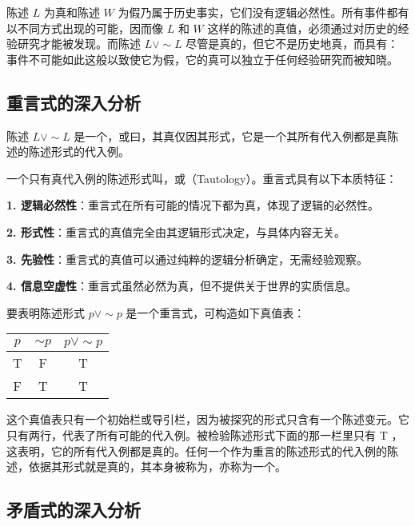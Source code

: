 陈述 $L$ 为真和陈述 $W$ 为假乃属于历史事实，它们没有逻辑必然性。所有事件都有以不同方式出现的可能，因而像 $L$ 和 $W$ 这样的陈述的真值，必须通过对历史的经验研究才能被发现。而陈述 $L \vee \sim L$ 尽管是真的，但它不是历史地真，而具有：事件不可能如此这般以致使它为假，它的真可以独立于任何经验研究而被知晓。

\subsection{重言式的深入分析}

陈述 $L \vee \sim L$ 是一个，或曰，其真仅因其形式，它是一个其所有代入例都是真陈述的陈述形式的代入例。

\begin{theorembox}[title=重言式的本质特征]
一个只有真代入例的陈述形式叫，或（Tautology）。重言式具有以下本质特征：

\textbf{1. 逻辑必然性}：重言式在所有可能的情况下都为真，体现了逻辑的必然性。

\textbf{2. 形式性}：重言式的真值完全由其逻辑形式决定，与具体内容无关。

\textbf{3. 先验性}：重言式的真值可以通过纯粹的逻辑分析确定，无需经验观察。

\textbf{4. 信息空虚性}：重言式虽然必然为真，但不提供关于世界的实质信息。
\end{theorembox}

要表明陈述形式 $p \vee \sim p$ 是一个重言式，可构造如下真值表：

\begin{center}
\begin{tabular}{|ccc|}
\hline
$p$ & $\sim p$ & $p \vee \sim p$ \\
\hline
T & F & T \\
F & T & T \\
\hline
\end{tabular}
\end{center}

这个真值表只有一个初始栏或导引栏，因为被探究的形式只含有一个陈述变元。它只有两行，代表了所有可能的代入例。被检验陈述形式下面的那一栏里只有 T ，这表明，它的所有代入例都是真的。任何一个作为重言的陈述形式的代入例的陈述，依据其形式就是真的，其本身被称为，亦称为一个。

\subsection{矛盾式的深入分析}

